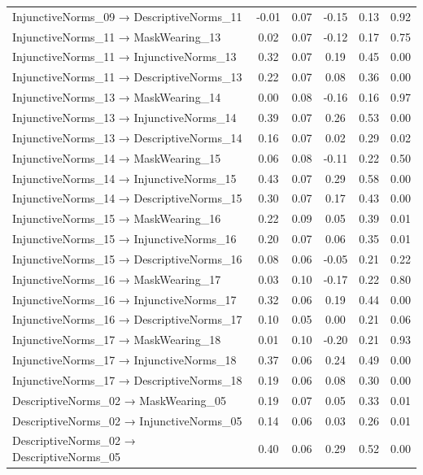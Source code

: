 \documentclass[
  man, donotrepeattitle,floatsintext]{apa6}
\begin{document}
\begin{center}
\begin{ThreePartTable}
{\begin{longtable}{lccccc}
InjunctiveNorms\_09 → DescriptiveNorms\_11 & -0.01 & 0.07 & -0.15 & 0.13 & 0.92\\
InjunctiveNorms\_11 → MaskWearing\_13 & 0.02 & 0.07 & -0.12 & 0.17 & 0.75\\
InjunctiveNorms\_11 → InjunctiveNorms\_13 & 0.32 & 0.07 & 0.19 & 0.45 & 0.00\\
InjunctiveNorms\_11 → DescriptiveNorms\_13 & 0.22 & 0.07 & 0.08 & 0.36 & 0.00\\
InjunctiveNorms\_13 → MaskWearing\_14 & 0.00 & 0.08 & -0.16 & 0.16 & 0.97\\
InjunctiveNorms\_13 → InjunctiveNorms\_14 & 0.39 & 0.07 & 0.26 & 0.53 & 0.00\\
InjunctiveNorms\_13 → DescriptiveNorms\_14 & 0.16 & 0.07 & 0.02 & 0.29 & 0.02\\
InjunctiveNorms\_14 → MaskWearing\_15 & 0.06 & 0.08 & -0.11 & 0.22 & 0.50\\
InjunctiveNorms\_14 → InjunctiveNorms\_15 & 0.43 & 0.07 & 0.29 & 0.58 & 0.00\\
InjunctiveNorms\_14 → DescriptiveNorms\_15 & 0.30 & 0.07 & 0.17 & 0.43 & 0.00\\
InjunctiveNorms\_15 → MaskWearing\_16 & 0.22 & 0.09 & 0.05 & 0.39 & 0.01\\
InjunctiveNorms\_15 → InjunctiveNorms\_16 & 0.20 & 0.07 & 0.06 & 0.35 & 0.01\\
InjunctiveNorms\_15 → DescriptiveNorms\_16 & 0.08 & 0.06 & -0.05 & 0.21 & 0.22\\
InjunctiveNorms\_16 → MaskWearing\_17 & 0.03 & 0.10 & -0.17 & 0.22 & 0.80\\
InjunctiveNorms\_16 → InjunctiveNorms\_17 & 0.32 & 0.06 & 0.19 & 0.44 & 0.00\\
InjunctiveNorms\_16 → DescriptiveNorms\_17 & 0.10 & 0.05 & 0.00 & 0.21 & 0.06\\
InjunctiveNorms\_17 → MaskWearing\_18 & 0.01 & 0.10 & -0.20 & 0.21 & 0.93\\
InjunctiveNorms\_17 → InjunctiveNorms\_18 & 0.37 & 0.06 & 0.24 & 0.49 & 0.00\\
InjunctiveNorms\_17 → DescriptiveNorms\_18 & 0.19 & 0.06 & 0.08 & 0.30 & 0.00\\
DescriptiveNorms\_02 → MaskWearing\_05 & 0.19 & 0.07 & 0.05 & 0.33 & 0.01\\
DescriptiveNorms\_02 → InjunctiveNorms\_05 & 0.14 & 0.06 & 0.03 & 0.26 & 0.01\\
DescriptiveNorms\_02 → DescriptiveNorms\_05 & 0.40 & 0.06 & 0.29 & 0.52 & 0.00\\

\end{longtable}}
\end{ThreePartTable}
\end{center}
\end{document}
